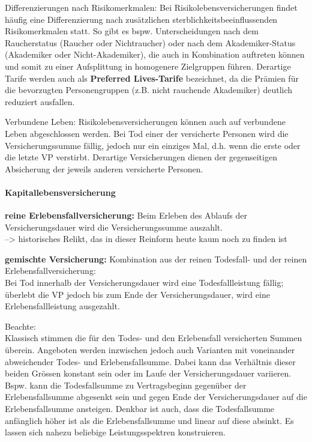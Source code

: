 \documentclass[
]{article}
\begin{document}
Differenzierungen nach Risikomerkmalen: Bei Risikolebensversicherungen
findet häufig eine Differenzierung nach zusätzlichen
sterblichkeitsbeeinflussenden Risikomerkmalen statt. So gibt es bspw.
Unterscheidungen nach dem Raucherstatus (Raucher oder Nichtraucher) oder
nach dem Akademiker-Status (Akademiker oder Nicht-Akademiker), die auch
in Kombination auftreten können und somit zu einer Aufsplittung in
homogenere Zielgruppen führen. Derartige Tarife werden auch als
\textbf{Preferred Lives-Tarife} bezeichnet, da die Prämien für die
bevorzugten Personengruppen (z.B. nicht rauchende Akademiker) deutlich
reduziert ausfallen.

Verbundene Leben: Risikolebensversicherungen können auch auf verbundene
Leben abgeschlossen werden. Bei Tod einer der versicherte Personen wird
die Versicherungssumme fällig, jedoch nur ein einziges Mal, d.h. wenn
die erste oder die letzte VP verstirbt. Derartige Versicherungen dienen
der gegenseitigen Absicherung der jeweils anderen versicherte Personen.

\hypertarget{kapitallebensversicherung}{%
\paragraph{Kapitallebensversicherung}\label{kapitallebensversicherung}}

\textbf{reine Erlebensfallversicherung:} Beim Erleben des Ablaufs der
Versicherungsdauer wird die Versicherungssumme auszahlt.\\
--\textgreater{} historisches Relikt, das in dieser Reinform heute kaum
noch zu finden ist

\textbf{gemischte Versicherung:} Kombination aus der reinen Todesfall-
und der reinen Erlebensfallversicherung:\\
Bei Tod innerhalb der Versicherungsdauer wird eine Todesfallleistung
fällig; überlebt die VP jedoch bis zum Ende der Versicherungsdauer, wird
eine Erlebensfallleistung ausgezahlt.

Beachte:\\
Klassisch stimmen die für den Todes- und den Erlebensfall versicherten
Summen überein. Angeboten werden inzwischen jedoch auch Varianten mit
voneinander abweichender Todes- und Erlebensfallsumme. Dabei kann das
Verhältnis dieser beiden Grössen konstant sein oder im Laufe der
Versicherungsdauer variieren. Bspw. kann die Todesfallsumme zu
Vertragsbeginn gegenüber der Erlebensfallsumme abgesenkt sein und gegen
Ende der Versicherungsdauer auf die Erlebensfallsumme ansteigen. Denkbar
ist auch, dass die Todesfallsumme anfänglich höher ist als die
Erlebensfallsumme und linear auf diese absinkt. Es lassen sich nahezu
beliebige Leistungsspektren konstruieren.
\end{document}
